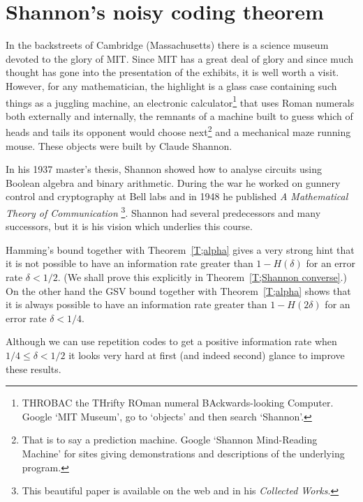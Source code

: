 \documentclass[12pt,a4paper]{article}
\theoremstyle{plain}
\theoremstyle{definition}
\begin{document}
    \section{Shannon's noisy coding theorem}
    In the backstreets of Cambridge
    (Massachusetts) there is a science museum devoted to
    the glory of MIT. Since MIT has a great deal of glory
    and since much thought has gone into the presentation
    of the exhibits, it is well worth a visit. However,
    for any mathematician, the highlight is a glass case
    containing such things as a juggling machine,
    an electronic calculator\footnote{THROBAC
    the THrifty ROman numeral BAckwards-looking Computer.
    Google `MIT Museum', go to `objects' and then
    search `Shannon'.}
    that uses Roman numerals both externally and internally,
    the remnants of a machine built to guess which
    of heads and tails its opponent would choose
    next\footnote{That is to say a prediction machine.
    Google `Shannon Mind-Reading Machine' for sites
    giving demonstrations and descriptions of the underlying program.}
    and a mechanical maze running mouse.
    These objects were built by Claude Shannon.

    In his 1937 master's thesis, Shannon showed how to
    analyse circuits using Boolean algebra and binary arithmetic.
    During the war he worked on gunnery control
    and cryptography at Bell labs and in 1948 he published
    \emph{A Mathematical Theory of Communication}%
    \footnote{This beautiful paper is available on the web
    and in his \emph{Collected Works}.}.
    Shannon had several predecessors and many successors,
    but it is his vision which underlies this course.

    Hamming's bound together with
    Theorem~\ref{T;alpha}
    gives a very strong hint that it is not possible to
    have an information rate greater than
    $1-H(\delta)$ for an error rate $\delta<1/2$.
    (We shall prove this explicitly in Theorem~\ref{T;Shannon converse}.)
    On the other hand the GSV bound
    together with
    Theorem~\ref{T;alpha}
    shows that it is always possible to
    have an information rate greater than
    $1-H(2\delta)$ for an error rate $\delta<1/4$.

    Although we can use repetition codes
    to get a positive information rate
    when $1/4\leq \delta<1/2$ it looks
    very hard at first (and indeed second) glance
    to improve these results.
\end{document}
